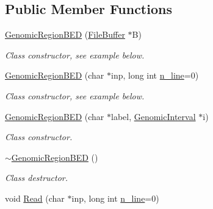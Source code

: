 \subsection*{Public Member Functions}
\begin{DoxyCompactItemize}
\item 
\hypertarget{classGenomicRegionBED_a89d54edc5809d113202c9f09f82e1057}{
\hyperlink{classGenomicRegionBED_a89d54edc5809d113202c9f09f82e1057}{GenomicRegionBED} (\hyperlink{classFileBuffer}{FileBuffer} $\ast$B)}
\label{classGenomicRegionBED_a89d54edc5809d113202c9f09f82e1057}

\begin{DoxyCompactList}\small\item\em Class constructor, see example below. \end{DoxyCompactList}\item 
\hypertarget{classGenomicRegionBED_a4d7c87327c1074258ac1e6b5ac87c9dd}{
\hyperlink{classGenomicRegionBED_a4d7c87327c1074258ac1e6b5ac87c9dd}{GenomicRegionBED} (char $\ast$inp, long int \hyperlink{classGenomicRegion_aefe2255aeed5338060190ded05cb9c0c}{n\_\-line}=0)}
\label{classGenomicRegionBED_a4d7c87327c1074258ac1e6b5ac87c9dd}

\begin{DoxyCompactList}\small\item\em Class constructor, see example below. \end{DoxyCompactList}\item 
\hypertarget{classGenomicRegionBED_aa6e68da10b635bcd84bf320b94a4d414}{
\hyperlink{classGenomicRegionBED_aa6e68da10b635bcd84bf320b94a4d414}{GenomicRegionBED} (char $\ast$label, \hyperlink{classGenomicInterval}{GenomicInterval} $\ast$i)}
\label{classGenomicRegionBED_aa6e68da10b635bcd84bf320b94a4d414}

\begin{DoxyCompactList}\small\item\em Class constructor. \end{DoxyCompactList}\item 
\hypertarget{classGenomicRegionBED_aa27241b7fbdb90e0b4b1e411045d080f}{
\hyperlink{classGenomicRegionBED_aa27241b7fbdb90e0b4b1e411045d080f}{$\sim$GenomicRegionBED} ()}
\label{classGenomicRegionBED_aa27241b7fbdb90e0b4b1e411045d080f}

\begin{DoxyCompactList}\small\item\em Class destructor. \end{DoxyCompactList}\item 
\hypertarget{classGenomicRegionBED_a707a1744e040214d78d37b928f1f0252}{
void \hyperlink{classGenomicRegionBED_a707a1744e040214d78d37b928f1f0252}{Read} (char $\ast$inp, long int \hyperlink{classGenomicRegion_aefe2255aeed5338060190ded05cb9c0c}{n\_\-line}=0)}
\label{classGenomicRegionBED_a707a1744e040214d78d37b928f1f0252}


\end{DoxyCompactItemize}
